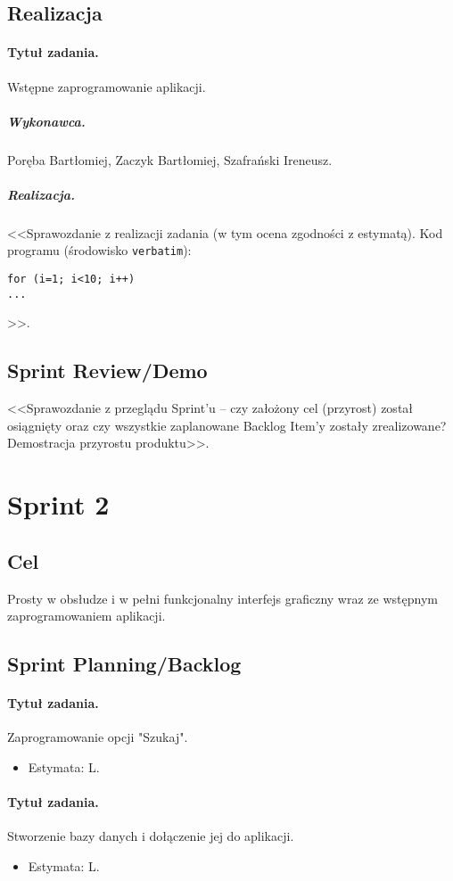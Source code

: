 \documentclass[a4paper]{article}
\begin{document}
\subsection{Realizacja}

\paragraph{Tytuł zadania.} Wstępne zaprogramowanie aplikacji.
\subparagraph{Wykonawca.} Poręba Bartłomiej, Zaczyk Bartłomiej, Szafrański Ireneusz.
\subparagraph{Realizacja.} <<Sprawozdanie z realizacji zadania (w tym ocena zgodności z estymatą). Kod programu (środowisko \texttt{verbatim}): \begin{verbatim}
for (i=1; i<10; i++)
...
\end{verbatim}>>.


\subsection{Sprint Review/Demo}
<<Sprawozdanie z przeglądu Sprint'u -- czy założony cel (przyrost) został osiągnięty oraz czy wszystkie zaplanowane Backlog Item'y zostały zrealizowane? Demostracja przyrostu produktu>>.



\section{Sprint 2}

\subsection{Cel} Prosty w obsłudze i w pełni funkcjonalny interfejs graficzny wraz ze wstępnym zaprogramowaniem aplikacji.

\subsection{Sprint Planning/Backlog}

\paragraph{Tytuł zadania.} Zaprogramowanie opcji "Szukaj".
\begin{itemize}
\item Estymata: L.
\end{itemize}

\paragraph{Tytuł zadania.} Stworzenie bazy danych i dołączenie jej do aplikacji.
\begin{itemize}
	\item Estymata: L.
\end{itemize}
\end{document}
